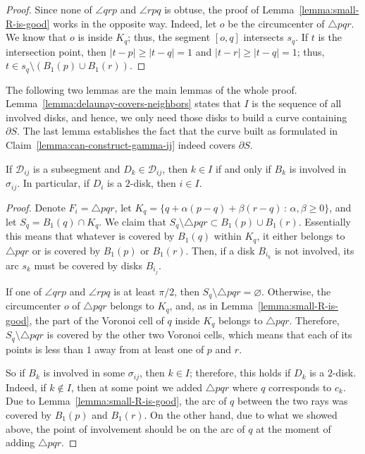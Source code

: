 \begin{appendices}
\begin{proof}
Since none of $\angle qrp$ and $\angle rpq$ is obtuse,
the proof of Lemma~\ref{lemma:small-R-is-good} works in the opposite way.
Indeed, let $o$ be the circumcenter of $\triangle pqr$. We know that $o$ is inside $K_q$; thus, the segment $[o, q]$ intersects $s_q$. If $t$ is the intersection point, then $|t - p|\geq |t - q| = 1$ and $|t - r|\geq |t - q| = 1$; thus, $t\in s_q\setminus(B_1(p)\cup B_1(r))$.
\end{proof}

The following two lemmas are the main lemmas of the whole proof. Lemma~\ref{lemma:delaunay-covers-neighbors} states that $I$ is the sequence of all involved disks, and hence, we only need those disks to build a curve containing $\partial S$. The last lemma establishes the fact that the curve built as formulated in Claim~\ref{lemma:can-construct-gamma-ij} indeed covers $\partial S$.

\begin{lemma}\label{lemma:delaunay-covers-neighbors}
If $\mathcal{D}_{ij}$ is a subsegment and $D_k\in\mathcal{D}_{ij}$, then $k\in I$ if and only if $B_k$ is involved in $\sigma_{ij}$. In particular, if $D_i$ is a $2$-disk, then $i\in I$.
\end{lemma}

\begin{proof}
Denote $F_i = \triangle pqr$, let $K_q = \{q + \alpha(p-q) + \beta(r-q)\,\colon\,\alpha, \beta\geq 0\}$, and let $S_q = B_1(q)\cap K_q$. We claim that $S_q\setminus\triangle{pqr}\subset B_1(p)\cup B_1(r)$. Essentially this means that whatever is covered by $B_1(q)$ within $K_q$, it either belongs to $\triangle pqr$ or is covered by $B_1(p)$ or $B_1(r)$. Then, if a disk $B_{i_k}$ is not involved, its arc $s_k$ must be covered by disks $B_{i_j}$.

If one of $\angle qrp$ and $\angle rpq$ is at least $\pi/2$, then $S_q\setminus\triangle pqr = \varnothing$. Otherwise, the circumcenter $o$ of $\triangle pqr$ belongs to $K_q$, and, as in Lemma~\ref{lemma:small-R-is-good}, the part of the Voronoi cell of $q$ inside $K_q$ belongs to $\triangle pqr$. Therefore, $S_q\setminus\triangle pqr$ is covered by the other two Voronoi cells, which means that each of its points is less than $1$ away from at least one of $p$ and $r$.

So if $B_k$ is involved in some $\sigma_{ij}$, then $k\in I$; therefore, this holds if $D_k$ is a $2$-disk. Indeed, if $k\notin I$, then at some point we added $\triangle pqr$ where $q$ corresponds to $c_k$. Due to Lemma~\ref{lemma:small-R-is-good}, the arc of $q$ between the two rays was covered by $B_1(p)$ and $B_1(r)$. On the other hand, due to what we showed above, the point of involvement should be on the arc of $q$ at the moment of adding $\triangle pqr$.


\end{proof}
\end{appendices}
